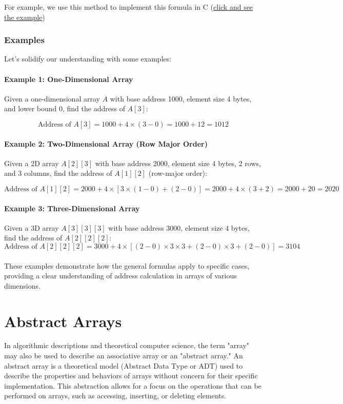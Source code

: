 \documentclass{book}
\begin{document}
For example, we use this method to implement this formula in C (\href{https://github.com/m-mdy-m/Arliz/blob/main/AddressCalculation/4D-Dimensional.c}{click and see the example})

\subsubsection{Examples}

Let’s solidify our understanding with some examples:

\paragraph{Example 1: One-Dimensional Array}
Given a one-dimensional array \( A \) with base address 1000, element size 4 bytes, and lower bound 0, find the address of \( A[3] \):

\[
\text{Address of } A[3] = 1000 + 4 \times (3 - 0) = 1000 + 12 = 1012
\]

\paragraph{Example 2: Two-Dimensional Array (Row Major Order)}
Given a 2D array \( A[2][3] \) with base address 2000, element size 4 bytes, 2 rows, and 3 columns, find the address of \( A[1][2] \) (row-major order):

\[
\text{Address of } A[1][2] = 2000 + 4 \times \left[ 3 \times (1 - 0) + (2 - 0) \right] = 2000 + 4 \times (3 + 2) = 2000 + 20 = 2020
\]

\paragraph{Example 3: Three-Dimensional Array}
Given a 3D array \( A[3][3][3] \) with base address 3000, element size 4 bytes, find the address of \( A[2][2][2] \):
\[\text{Address of } A[2][2][2] = 3000 + 4 \times \left[ (2 - 0) \times 3 \times 3 + (2 - 0) \times 3 + (2 - 0) \right] = 3104\]\\
These examples demonstrate how the general formulas apply to specific cases, providing a clear understanding of address calculation in arrays of various dimensions.



\section{Abstract Arrays}
In algorithmic descriptions and theoretical computer science, the term "array" may also be used to describe an associative array or an "abstract array." An abstract array is a theoretical model (Abstract Data Type or ADT) used to describe the properties and behaviors of arrays without concern for their specific implementation. This abstraction allows for a focus on the operations that can be performed on arrays, such as accessing, inserting, or deleting elements.
\end{document}
